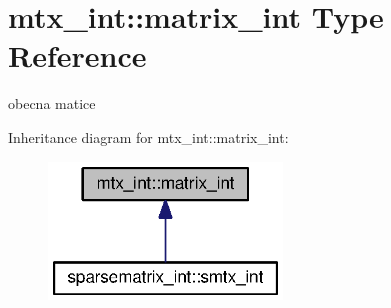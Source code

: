 \section{mtx\+\_\+int\+:\+:matrix\+\_\+int Type Reference}
\label{structmtx__int_1_1matrix__int}


obecna matice  




Inheritance diagram for mtx\+\_\+int\+:\+:matrix\+\_\+int\+:\nopagebreak
\begin{figure}[H]
\begin{center}
\leavevmode
\includegraphics[width=176pt]{structmtx__int_1_1matrix__int__inherit__graph}
\end{center}
\end{figure}
